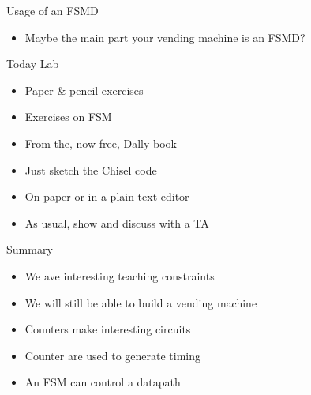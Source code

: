 \begin{frame}[fragile]{Usage of an FSMD}
\begin{itemize}
\item Maybe the main part your vending machine is an FSMD?
\end{itemize}
\end{frame}




\begin{frame}[fragile]{Today Lab}
\begin{itemize}
\item Paper \& pencil exercises
\item Exercises on FSM
\item From the, now free, Dally book
\item Just sketch the Chisel code
\item On paper or in a plain text editor
\item As usual, show and discuss with a TA
\end{itemize}
\end{frame}

\begin{frame}[fragile]{Summary}
\begin{itemize}
\item We ave interesting teaching constraints
\item We will still be able to build a vending machine
\item Counters make interesting circuits
\item Counter are used to generate timing
\item An FSM can control a datapath
\end{itemize}
\end{frame}




